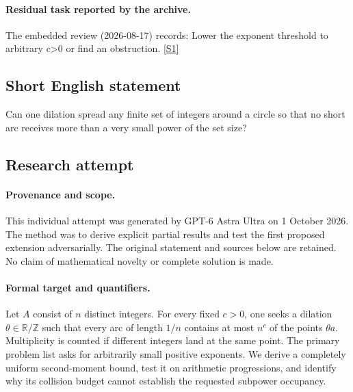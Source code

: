 \documentclass[11pt,a4paper]{article}
\newcommand{\Z}{\mathbb{Z}}
\newcommand{\R}{\mathbb{R}}
\newcommand{\sref}[2]{\hyperlink{source:#1:#2}{[S#2]}}
\begin{document}
\paragraph{Residual task reported by the archive.}

The embedded review (2026-08-17) records: Lower the exponent threshold to arbitrary c>0 or find an obstruction. \sref{140}{1}

\subsection{Short English statement}

Can one dilation spread any finite set of integers around a circle so that no short arc receives more than a very small power of the set size?

\subsection{Research attempt}

\paragraph{Provenance and scope.}
This individual attempt was generated by GPT-6 Astra Ultra on 1 October 2026. The method was to derive explicit partial results and test the first proposed extension adversarially. The original statement and sources below are retained. No claim of mathematical novelty or complete solution is made.

\paragraph{Formal target and quantifiers.}
Let $A$ consist of $n$ distinct integers. For every fixed $c>0$, one seeks a dilation $\theta\in\R/\Z$ such that every arc of length $1/n$ contains at most $n^c$ of the points $\theta a$. Multiplicity is counted if different integers land at the same point. The primary problem list asks for arbitrarily small positive exponents. We derive a completely uniform second-moment bound, test it on arithmetic progressions, and identify why its collision budget cannot establish the requested subpower occupancy.
\end{document}
